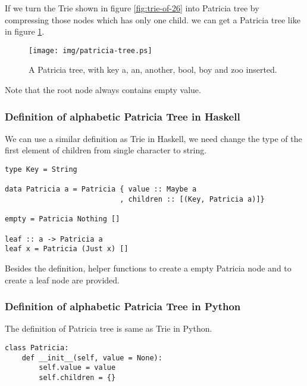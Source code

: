\documentclass{article}
\begin{document}
If we turn the Trie shown in figure \ref{fig:trie-of-26} into Patricia
tree by compressing those nodes which has only one child. we can get
a Patricia tree like in figure \ref{fig:patricia-tree}.

\begin{figure}[htbp]
  \begin{center}
    \texttt{[image: img/patricia-tree.ps]}
      \caption{A Patricia tree, with key a, an, another, bool,
    boy and zoo inserted.}
      \label{fig:patricia-tree}
  \end{center}
\end{figure}

Note that the root node always contains empty value.

\subsubsection*{Definition of alphabetic Patricia Tree in Haskell}
We can use a similar definition as Trie in Haskell, we need change
the type of the first element of children from single character to
string.

\lstset{language=Haskell}
\begin{lstlisting}
type Key = String

data Patricia a = Patricia { value :: Maybe a
                           , children :: [(Key, Patricia a)]}

empty = Patricia Nothing []

leaf :: a -> Patricia a
leaf x = Patricia (Just x) []
\end{lstlisting}

Besides the definition, helper functions to create a empty
Patricia node and to create a leaf node are provided.

\subsubsection*{Definition of alphabetic Patricia Tree in Python}
The definition of Patricia tree is same as Trie in Python.

\lstset{language=Python}
\begin{lstlisting}
class Patricia:
    def __init__(self, value = None):
        self.value = value
        self.children = {}
\end{lstlisting}

\end{document}
